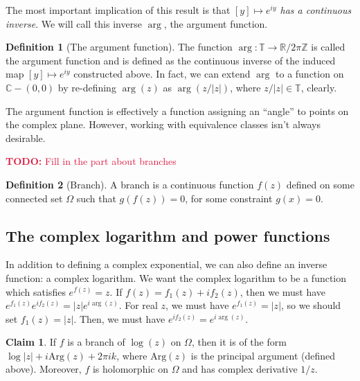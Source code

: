 \documentclass[aps,pra,showpacs,notitlepage,onecolumn,superscriptaddress,nofootinbib]{revtex4-1}
\newcommand{\pop}[1]{\textcolor{crimson}{#1}}
\theoremstyle{definition}
\newtheorem{definition}{Definition}[section]
\newtheorem{claim}{Claim}[section]
\begin{document}
The most important implication of this result is that \emph{$[y] \mapsto e^{iy}$ has a continuous inverse}. We will call this inverse $\arg$, the argument function.

\begin{definition}[The argument function]
  The function $\arg : \mathbb{T} \rightarrow \mathbb{R}/2\pi\mathbb{Z}$ is called the argument function and is defined as the continuous inverse of the induced map $[y] \mapsto e^{iy}$ constructed above.
  In fact, we can extend $\arg$ to a function on $\mathbb{C} - (0, 0)$ by re-defining $\arg(z)$ as $\arg(z/|z|)$, where $z/|z| \in \mathbb{T}$, clearly.
\end{definition}

\noindent The argument function is effectively a function assigning an ``angle'' to points on the complex plane. However, working with equivalence classes isn't always desirable.
\newline

\noindent \pop{\textbf{TODO:} Fill in the part about branches}
\newline

\begin{definition}[Branch]
  A branch is a continuous function $f(z)$ defined on some connected set $\Omega$ such that $g(f(z)) = 0$, for some constraint $g(x) = 0$.
  \end{definition}

\subsection{The complex logarithm and power functions}

\noindent In addition to defining a complex exponential, we can also define an inverse function: a complex logarithm. We want the complex logarithm to be a function
which satisfies $e^{f(z)} = z$. If $f(z) = f_1(z) + i f_2(z)$, then we must have $e^{f_1(z)} e^{i f_2(z)} = |z| e^{i \arg(z)}$. For real $z$, we must have $e^{f_1(z)} = |z|$, so
we should set $f_1(z) = |z|$. Then, we must have $e^{i f_2(z)} = e^{i \arg(z)}$.

\begin{claim}
  If $f$ is a branch of $\log(z)$ on $\Omega$, then it is of the form $\log |z| + i \text{Arg}(z) + 2\pi i k$, where $\text{Arg}(z)$ is the principal argument (defined above).
  Moreover, $f$ is holomorphic on $\Omega$ and has complex derivative $1/z$.
\end{claim}
\end{document}
